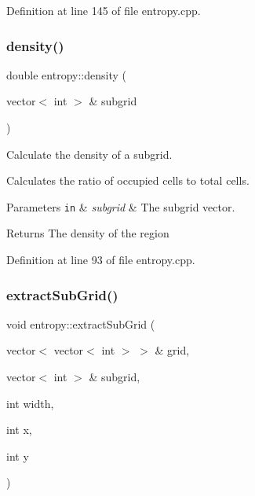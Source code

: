 Definition at line 145 of file entropy.\+cpp.

\mbox{\label{classentropy_ada553811d6bcfb5ecb88691822d07834}} 
\subsubsection{\texorpdfstring{density()}{density()}}
{\footnotesize\ttfamily double entropy\+::density (\begin{DoxyParamCaption}\item[{vector$<$ int $>$ \&}]{subgrid }\end{DoxyParamCaption})}



Calculate the density of a subgrid. 

Calculates the ratio of occupied cells to total cells. 
\begin{DoxyParams}[1]{Parameters}
\mbox{\tt in}  & {\em subgrid} & The subgrid vector. \\
\hline
\end{DoxyParams}
\begin{DoxyReturn}{Returns}
The density of the region 
\end{DoxyReturn}


Definition at line 93 of file entropy.\+cpp.

\mbox{\label{classentropy_a4dce3a1c33340db5371c2b5d4b64a62e}} 
\subsubsection{\texorpdfstring{extract\+Sub\+Grid()}{extractSubGrid()}}
{\footnotesize\ttfamily void entropy\+::extract\+Sub\+Grid (\begin{DoxyParamCaption}\item[{vector$<$ vector$<$ int $>$ $>$ \&}]{grid,  }\item[{vector$<$ int $>$ \&}]{subgrid,  }\item[{int}]{width,  }\item[{int}]{x,  }\item[{int}]{y }\end{DoxyParamCaption})}



